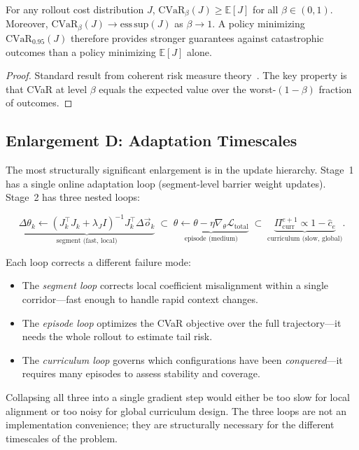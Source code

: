 \begin{proposition}
\label{prop:ch5:cvar}
For any rollout cost distribution $J$,
$\mathrm{CVaR}_\beta(J) \geq \mathbb{E}[J]$ for all $\beta \in (0,1)$.
Moreover, $\mathrm{CVaR}_\beta(J) \to \mathrm{ess\,sup}(J)$ as
$\beta \to 1$.
A policy minimizing $\mathrm{CVaR}_{0.95}(J)$ therefore provides
stronger guarantees against catastrophic outcomes than a policy
minimizing $\mathbb{E}[J]$ alone.
\end{proposition}

\begin{proof}
Standard result from coherent risk measure theory~\citep{rockafellar2002cvar}.
The key property is that CVaR at level $\beta$ equals the expected
value over the worst-$(1-\beta)$ fraction of outcomes.
\end{proof}

\subsection{Enlargement D: Adaptation Timescales}
\label{subsec:ch5:timescalesD}

The most structurally significant enlargement is in the update hierarchy.
Stage~1 has a single online adaptation loop (segment-level barrier weight
updates).
Stage~2 has three nested loops:

\begin{equation}
  \underbrace{\Delta\theta_k \leftarrow
    (J_k^\top J_k + \lambda_J I)^{-1}J_k^\top\Delta\vec{o}_k}_{\text{segment (fast, local)}}
  \;\subset\;
  \underbrace{\theta \leftarrow \theta -
    \eta\nabla_\theta\mathcal{L}_{\mathrm{total}}}_{\text{episode (medium)}}
  \;\subset\;
  \underbrace{\Pi_{\mathrm{curr}}^{e+1} \propto
    1-\hat{c}_e}_{\text{curriculum (slow, global)}}.
  \label{eq:ch5:nested_loops}
\end{equation}

\begin{remark}
\label{rem:ch5:loops}
Each loop corrects a different failure mode:
\begin{itemize}
  \item The \emph{segment loop} corrects local coefficient misalignment
        within a single corridor—fast enough to handle rapid context
        changes.
  \item The \emph{episode loop} optimizes the CVaR objective over the
        full trajectory—it needs the whole rollout to estimate tail risk.
  \item The \emph{curriculum loop} governs which configurations have
        been \emph{conquered}—it requires many episodes to assess
        stability and coverage.
\end{itemize}
Collapsing all three into a single gradient step would either be too
slow for local alignment or too noisy for global curriculum design.
The three loops are not an implementation convenience; they are
structurally necessary for the different timescales of the problem.
\end{remark}

